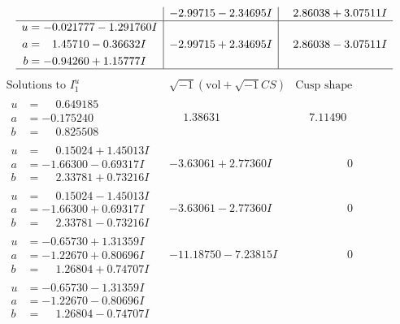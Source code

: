 \documentclass[1p]{elsarticle_modified}
\theoremstyle{definition}
\newcommand{\I}{\sqrt{-1}}
\begin{document}
$$\begin{array}{c|c|c}
 & -2.99715 - 2.34695 I & \phantom{-}2.86038 + 3.07511 I \\ \hline\begin{aligned}
u &= -0.021777 - 1.291760 I \\
a &= \phantom{-}1.45710 - 0.36632 I \\
b &= -0.94260 + 1.15777 I\end{aligned}
 & -2.99715 + 2.34695 I & \phantom{-}2.86038 - 3.07511 I\\
 \hline 
 \end{array}$$\newpage$$\begin{array}{c|c|c}  
\text{Solutions to }I^u_{1}& \I (\text{vol} + \sqrt{-1}CS) & \text{Cusp shape}\\
 \hline 
\begin{aligned}
u &= \phantom{-}0.649185\phantom{ +0.000000I} \\
a &= -0.175240\phantom{ +0.000000I} \\
b &= \phantom{-}0.825508\phantom{ +0.000000I}\end{aligned}
 & \phantom{-}1.38631\phantom{ +0.000000I} & \phantom{-}7.11490\phantom{ +0.000000I} \\ \hline\begin{aligned}
u &= \phantom{-}0.15024 + 1.45013 I \\
a &= -1.66300 - 0.69317 I \\
b &= \phantom{-}2.33781 + 0.73216 I\end{aligned}
 & -3.63061 + 2.77360 I & \phantom{-0.000000 } 0 \\ \hline\begin{aligned}
u &= \phantom{-}0.15024 - 1.45013 I \\
a &= -1.66300 + 0.69317 I \\
b &= \phantom{-}2.33781 - 0.73216 I\end{aligned}
 & -3.63061 - 2.77360 I & \phantom{-0.000000 } 0 \\ \hline\begin{aligned}
u &= -0.65730 + 1.31359 I \\
a &= -1.22670 + 0.80696 I \\
b &= \phantom{-}1.26804 + 0.74707 I\end{aligned}
 & -11.18750 - 7.23815 I & \phantom{-0.000000 } 0 \\ \hline\begin{aligned}
u &= -0.65730 - 1.31359 I \\
a &= -1.22670 - 0.80696 I \\
b &= \phantom{-}1.26804 - 0.74707 I\end{aligned}

\end{array}$$
\end{document}
